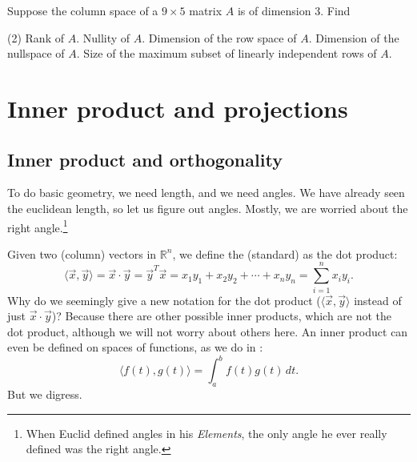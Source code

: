 \begin{exercise}
Suppose the column space of a $9 \times 5$ matrix $A$ is of dimension 3.  Find
\begin{tasks}(2)
\task
Rank of $A$.
\task
Nullity of $A$.
\task
Dimension of the row space of $A$.
\task
Dimension of the nullspace of $A$.
\task
Size of the maximum subset of
linearly independent rows of $A$.
\end{tasks}
\end{exercise}


\sectionnewpage
\section{Inner product and projections}
\label{innerproduct:section}



\subsection{Inner product and orthogonality}

To do basic geometry, we need length, and we need angles.
We have already seen the euclidean length, so let us figure out angles.
Mostly, we are worried about
the right angle.\footnote{When Euclid defined angles in his
\emph{Elements}, the only angle he ever really defined was the right angle.}

Given two (column) vectors in ${\mathbb{R}}^n$,
we define the (standard)
\emph{} as
the dot product:
\begin{equation*}
\langle \vec{x} , \vec{y} \rangle =
\vec{x} \cdot \vec{y}
=
\vec{y}^T \vec{x}
=
x_1 y_1 + x_2 y_2 + \cdots + x_n y_n
=
\sum_{i=1}^n x_i y_i .
\end{equation*}
Why do we seemingly give a new notation for the dot product
($\langle \vec{x} , \vec{y} \rangle$ instead of just
$\vec{x} \cdot \vec{y}$)?
Because there are other possible inner products, which are not the dot
product, although we will not worry about others here.
An inner product can even be defined on spaces of functions,
as we do in
:
\begin{equation*}
\langle f(t) , g(t) \rangle =
\int_{a}^{b}
f(t) g(t) \, dt .
\end{equation*}
But we digress.

